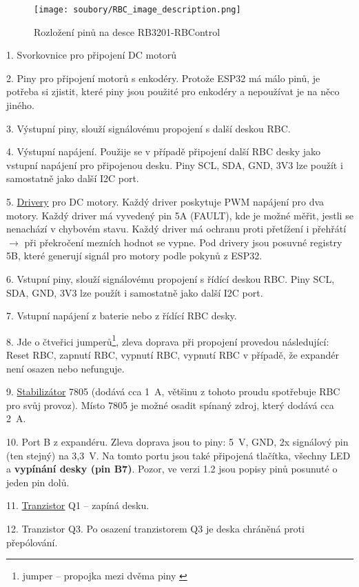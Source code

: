  \begin{figure}[h]
 	\texttt{[image: soubory/RBC\_image\_description.png]}  %
 	\caption{Rozložení pinů na desce RB3201-RBControl} 
 	\label{fig:rbc}
 	\end{figure}	


1. Svorkovnice pro připojení DC motorů 

2.  Piny pro připojení motorů s enkodéry. Protože ESP32 má málo pinů, je potřeba si zjistit, které piny jsou použité pro enkodéry a nepoužívat je na něco jiného. 

3. Výstupní piny, slouží signálovému propojení s další deskou RBC. 

4. Výstupní napájení. Použije se v případě připojení další RBC desky jako vstupní napájení pro připojenou desku. 
Piny SCL, SDA, GND, 3V3 lze použít i samostatně jako další I2C port.

5. \hyperref[driver]{Drivery} pro DC motory. Každý driver poskytuje PWM napájení pro dva motory. 
Každý driver má vyvedený pin 5A (FAULT), kde je možné měřit, jestli se nenachází v chybovém stavu. 
Každý driver má ochranu proti přetížení i přehřátí $\rightarrow$ při překročení mezních hodnot se vypne. 
Pod drivery jsou posuvné registry 5B, které generují signál pro motory podle pokynů z ESP32.

6. Vstupní piny, slouží signálovému propojení s řídící deskou RBC. 
Piny SCL, SDA, GND, 3V3 lze použít i samostatně jako další I2C port.

7. Vstupní napájení z baterie nebo z řídící RBC desky. 

8. Jde o čtveřici jumperů\footnote{jumper -- propojka mezi dvěma piny  \label{jumper} }, zleva doprava při propojení provedou následující: Reset RBC, zapnutí RBC, vypnutí RBC, vypnutí RBC v případě, že expandér není osazen nebo nefunguje.  

9.  \hyperref[stabilizator]{Stabilizátor} 7805 (dodává cca 1~A, většinu z tohoto proudu spotřebuje RBC pro svůj provoz). Místo 7805 je možné osadit spínaný zdroj, který dodává cca 2~A.

10. Port B z expandéru. 
Zleva doprava jsou to piny: 5~V, GND, 2x signálový pin (ten stejný) na 3,3~V.
Na tomto portu jsou také připojená tlačítka, všechny LED a \textbf{vypínání desky (pin B7)}. Pozor, ve verzi 1.2 jsou popisy pinů posunuté o jeden pin dolů.

11. \hyperref[tranzistor]{Tranzistor} Q1 -- zapíná desku. 

12.  Tranzistor Q3. Po osazení tranzistorem Q3 je deska chráněná proti přepólování.

